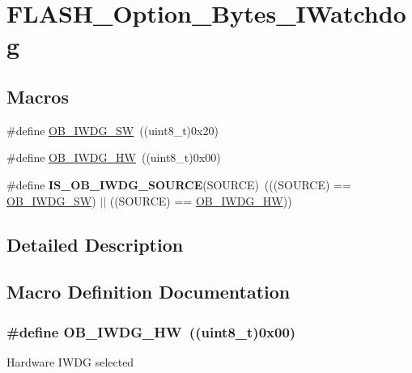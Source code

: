 \hypertarget{group___f_l_a_s_h___option___bytes___i_watchdog}{\section{F\-L\-A\-S\-H\-\_\-\-Option\-\_\-\-Bytes\-\_\-\-I\-Watchdog}
\label{group___f_l_a_s_h___option___bytes___i_watchdog}
}
\subsection*{Macros}
\begin{DoxyCompactItemize}
\item 
\#define \hyperlink{group___f_l_a_s_h___option___bytes___i_watchdog_ga5a357e232c955444c3f2ccb9a937ffce}{O\-B\-\_\-\-I\-W\-D\-G\-\_\-\-S\-W}~((uint8\-\_\-t)0x20)
\item 
\#define \hyperlink{group___f_l_a_s_h___option___bytes___i_watchdog_gadfcbfa963d79c339ec8e2d5a7734e47a}{O\-B\-\_\-\-I\-W\-D\-G\-\_\-\-H\-W}~((uint8\-\_\-t)0x00)
\item 
\hypertarget{group___f_l_a_s_h___option___bytes___i_watchdog_gaf2871652c08e76499d9449be6556f12c}{\#define {\bfseries I\-S\-\_\-\-O\-B\-\_\-\-I\-W\-D\-G\-\_\-\-S\-O\-U\-R\-C\-E}(S\-O\-U\-R\-C\-E)~(((S\-O\-U\-R\-C\-E) == \hyperlink{group___f_l_a_s_h___option___bytes___i_watchdog_ga5a357e232c955444c3f2ccb9a937ffce}{O\-B\-\_\-\-I\-W\-D\-G\-\_\-\-S\-W}) $|$$|$ ((S\-O\-U\-R\-C\-E) == \hyperlink{group___f_l_a_s_h___option___bytes___i_watchdog_gadfcbfa963d79c339ec8e2d5a7734e47a}{O\-B\-\_\-\-I\-W\-D\-G\-\_\-\-H\-W}))}\label{group___f_l_a_s_h___option___bytes___i_watchdog_gaf2871652c08e76499d9449be6556f12c}

\end{DoxyCompactItemize}


\subsection{Detailed Description}


\subsection{Macro Definition Documentation}
\hypertarget{group___f_l_a_s_h___option___bytes___i_watchdog_gadfcbfa963d79c339ec8e2d5a7734e47a}{
\subsubsection[{O\-B\-\_\-\-I\-W\-D\-G\-\_\-\-H\-W}]{\setlength{\rightskip}{0pt plus 5cm}\#define O\-B\-\_\-\-I\-W\-D\-G\-\_\-\-H\-W~((uint8\-\_\-t)0x00)}}\label{group___f_l_a_s_h___option___bytes___i_watchdog_gadfcbfa963d79c339ec8e2d5a7734e47a}
Hardware I\-W\-D\-G selected 

